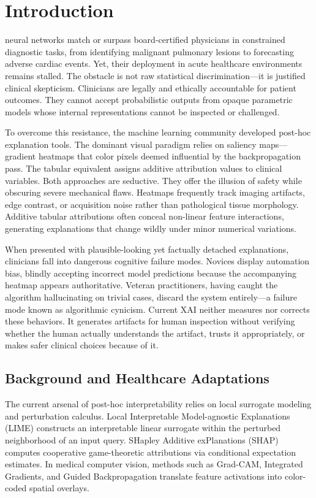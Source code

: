 \documentclass[10pt,journal,compsoc]{IEEEtran}
\begin{document}
\maketitle
\IEEEdisplaynontitleabstractindextext
\IEEEpeerreviewmaketitle

\section{Introduction}

 neural networks match or surpass board-certified physicians in constrained diagnostic tasks, from identifying malignant pulmonary lesions to forecasting adverse cardiac events. Yet, their deployment in acute healthcare environments remains stalled. The obstacle is not raw statistical discrimination---it is justified clinical skepticism. Clinicians are legally and ethically accountable for patient outcomes. They cannot accept probabilistic outputs from opaque parametric models whose internal representations cannot be inspected or challenged. 

To overcome this resistance, the machine learning community developed post-hoc explanation tools. The dominant visual paradigm relies on saliency maps---gradient heatmaps that color pixels deemed influential by the backpropagation pass. The tabular equivalent assigns additive attribution values to clinical variables. Both approaches are seductive. They offer the illusion of safety while obscuring severe mechanical flaws. Heatmaps frequently track imaging artifacts, edge contrast, or acquisition noise rather than pathological tissue morphology. Additive tabular attributions often conceal non-linear feature interactions, generating explanations that change wildly under minor numerical variations. 

When presented with plausible-looking yet factually detached explanations, clinicians fall into dangerous cognitive failure modes. Novices display automation bias, blindly accepting incorrect model predictions because the accompanying heatmap appears authoritative. Veteran practitioners, having caught the algorithm hallucinating on trivial cases, discard the system entirely---a failure mode known as algorithmic cynicism. Current XAI neither measures nor corrects these behaviors. It generates artifacts for human inspection without verifying whether the human actually understands the artifact, trusts it appropriately, or makes safer clinical choices because of it.

\subsection{Background and Healthcare Adaptations}
The current arsenal of post-hoc interpretability relies on local surrogate modeling and perturbation calculus. Local Interpretable Model-agnostic Explanations (LIME) constructs an interpretable linear surrogate within the perturbed neighborhood of an input query. SHapley Additive exPlanations (SHAP) computes cooperative game-theoretic attributions via conditional expectation estimates. In medical computer vision, methods such as Grad-CAM, Integrated Gradients, and Guided Backpropagation translate feature activations into color-coded spatial overlays.
\end{document}
